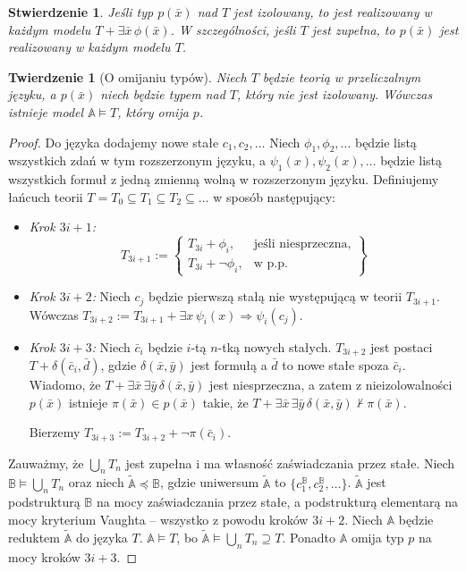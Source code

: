 \documentclass{article}
\newcommand{\A}{\mathbb{A}}
\newcommand{\B}{\mathbb{B}}
\theoremstyle{plain}
\newtheorem{tw}[thm]{Twierdzenie}
\newtheorem{stw}[thm]{Stwierdzenie}
\theoremstyle{definition}
\theoremstyle{remark}
\begin{document}
\begin{stw}
	Jeśli typ $p(\bar{x})$ nad $T$ jest izolowany, to jest realizowany w
	każdym modelu $T + \exists \bar{x} \, \phi(\bar{x})$. W szczególności,
	jeśli $T$ jest zupełna, to $p(\bar{x})$ jest realizowany w każdym
	modelu $T$.
\end{stw}

\begin{tw}[O omijaniu typów]
	\label{tw:omi}
	Niech $T$ będzie teorią w przeliczalnym języku, a $p(\bar{x})$ niech
	będzie typem nad $T$, który nie jest izolowany. Wówczas istnieje model
	$\A \models T$, który omija $p$.
\end{tw}
\begin{proof}
	Do języka dodajemy nowe stałe $c_1, c_2, \ldots$
	Niech $\phi_1, \phi_2, \ldots $ będzie listą wszystkich zdań w tym
	rozszerzonym języku, a $\psi_1(x), \psi_2(x), \ldots$ będzie listą
	wszystkich formuł z jedną zmienną wolną w rozszerzonym języku.
	Definiujemy łańcuch teorii $T = T_0 \subseteq T_1 \subseteq T_2
	\subseteq \ldots$ w sposób następujący:
	\begin{itemize}
		\item \textit{Krok $3i+1$:}
			\[
				 T_{3i+1} := \left\{\begin{array}{lr}
						 T_{3i} + \phi_i, & \text{jeśli
						 niesprzeczna,}\\
						 T_{3i} + \neg \phi_i, &
						 \text{w p.p.}
				 \end{array}\right\}
			\]

		\item \textit{Krok $3i+2$:}
			Niech $c_j$ będzie pierwszą stałą nie występującą w
			teorii $T_{3i+1}$. Wówczas $T_{3i+2} := T_{3i+1} +
			\exists x \, \psi_i(x) \Rightarrow \psi_i(c_j)$.
		\item \textit{Krok $3i+3$:}
			Niech $\bar{c}_i$ będzie $i$-tą $n$-tką nowych stałych.
			$T_{3i+2}$ jest postaci $T + \delta(\bar{c}_i,
			\bar{d})$, gdzie $\delta(\bar{x}, \bar{y})$ jest
			formułą a $\bar{d}$ to nowe stałe spoza $\bar{c}_i$.
			Wiadomo, że $T + \exists \bar{x} \, \exists \bar{y} \,
			\delta(\bar{x}, \bar{y})$ jest niesprzeczna, a zatem z
			nieizolowalności $p(\bar{x})$ istnieje $\pi(\bar{x})
			\in p(\bar{x})$ takie, że $T + \exists \bar{x} \,
			\exists \bar{y} \, \delta(\bar{x}, \bar{y}) \not \vdash
			\pi(\bar{x})$.

			Bierzemy $T_{3i+3} := T_{3i+2} + \neg \pi(\bar{c}_i)$.
	\end{itemize}
	Zauważmy, że $\bigcup_n T_n$ jest zupełna i ma własność zaświadczania
	przez stałe. Niech $\B \models \bigcup_n T_n$ oraz niech
	$\widetilde{\A} \preccurlyeq \B$, gdzie uniwersum $\widetilde{\A}$ to
	$\{c_1^{\B}, c_2^{\B}, \ldots\}$. $\widetilde{\A}$ jest podstrukturą
	$\B$ na mocy zaświadczania przez stałe, a podstrukturą elementarą na
	mocy kryterium Vaughta -- wszystko z powodu kroków $3i+2$. Niech $\A$
	będzie reduktem $\widetilde{\A}$ do języka $T$. $\A \models T$, bo
	$\widetilde{\A} \models \bigcup_n T_n \supseteq T$. Ponadto $\A$ omija
	typ $p$ na mocy kroków $3i+3$.
\end{proof}
\end{document}
